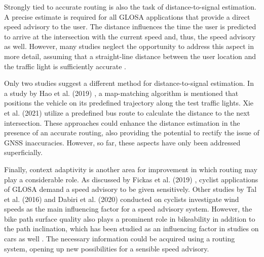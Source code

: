 Strongly tied to accurate routing is also the task of distance-to-signal estimation. A precise estimate is required for all GLOSA applications that provide a direct speed advisory to the user. The distance influences the time the user is predicted to arrive at the intersection with the current speed and, thus, the speed advisory as well. However, many studies neglect the opportunity to address this aspect in more detail, assuming that a straight-line distance between the user location and the traffic light is sufficiently accurate \cite{iglesias_i2v_2008, katsaros_performance_2011, koukoumidis_signalguru_2011, koukoumidis_leveraging_2012, krause_traffic_2012, li_open_2012, stevanovic_green_2013, eckhoff_potentials_2013, tal_vehicular-communications-based_2016, bernais_design_2016, stebbins_characterising_2017, sharara_impact_2019}. 

Only two studies suggest a different method for distance-to-signal estimation. In a study by Hao et al. (2019) \cite{hao_eco-approach_2019}, a map-matching algorithm is mentioned that positions the vehicle on its predefined trajectory along the test traffic lights. Xie et al. (2021) \cite{xie_dynamic_2021} utilize a predefined bus route to calculate the distance to the next intersection. These approaches could enhance the distance estimation in the presence of an accurate routing, also providing the potential to rectify the issue of GNSS inaccuracies. However, so far, these aspects have only been addressed superficially.

Finally, context adaptivity is another area for improvement in which routing may play a considerable role. As discussed by Fickas et al. (2019) \cite{fickas_fast_2019}, cyclist applications of GLOSA demand a speed advisory to be given sensitively. Other studies by Tal et al. (2016) \cite{tal_vehicular-communications-based_2016} and Dabiri et al. (2020) \cite{dabiri_optimized_2020} conducted on cyclists investigate wind speeds as the main influencing factor for a speed advisory system. However, the bike path surface quality also plays a prominent role in bikeability \cite{wasserman_evaluating_2019} in addition to the path inclination, which has been studied as an influencing factor in studies on cars as well \cite{zhang_green_2020}. The necessary information could be acquired using a routing system, opening up new possibilities for a sensible speed advisory.

